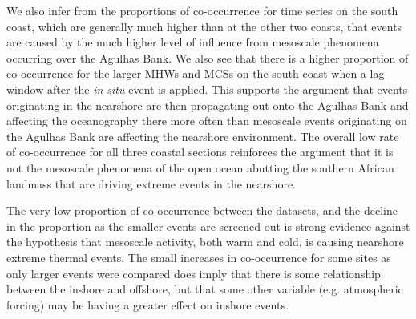 \documentclass[a4paper,10pt,review]{elsarticle}
\begin{document}
We also infer from the proportions of co-occurrence for time series on the south coast, which are generally much higher than at the other two coasts, that events are caused by the much higher level of influence from mesoscale phenomena occurring over the Agulhas Bank. We also see that there is a higher proportion of co-occurrence for the larger MHWs and MCSs on the south coast when a lag window after the \emph{in situ} event is applied. This supports the argument that events originating in the nearshore are then propagating out onto the Agulhas Bank and affecting the oceanography there more often than mesoscale events originating on the Agulhas Bank are affecting the nearshore environment. The overall low rate of co-occurrence for all three coastal sections reinforces the argument that it is not the mesoscale phenomena of the open ocean abutting the southern African landmass that are driving extreme events in the nearshore.

The very low proportion of co-occurrence between the datasets, and the decline in the proportion as the smaller events are screened out is strong evidence against the hypothesis that mesoscale activity, both warm and cold, is causing nearshore extreme thermal events. The small increases in co-occurrence for some sites as only larger events were compared does imply that there is some relationship between the inshore and offshore, but that some other variable (e.g. atmospheric forcing) may be having a greater effect on inshore events.
\end{document}

